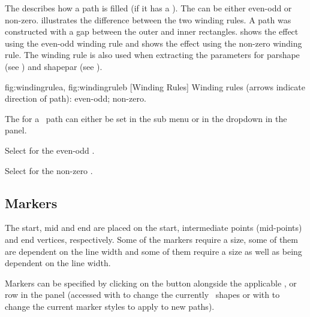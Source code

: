 The  describes how a \gls{path} is
filled (if it has a ). The
 can be either
even-odd or non-zero.  illustrates the
difference between the two winding rules. A \gls*{path} was constructed
with a \gls{gap} between the outer and inner rectangles.
 shows the effect using the even-odd
winding rule and  shows the effect
using the non-zero winding rule. The winding rule is also used when
extracting the parameters for
\gls{parshape} (see ) and
\gls{shapepar} (see ).

{
 {fig:windingrulea}{}{},
 {fig:windingruleb}{}{}
}
[Winding Rules]
{Winding rules (arrows indicate direction of path):
 even-odd;
 non-zero.}


The  for a \selected\ path can either be set
in the  sub menu or in the
 \gls{dropdown} in the
 panel.


Select  for the even-odd 
.


Select  for the non-zero 
.


\subsection{Markers}\label{sec:markers}

The start, mid and end  are placed on
the start, intermediate points (mid-points) and end vertices, respectively. Some of the
markers require a size, some of them are dependent on the line width
and some of them require a size as well as being dependent on the
line width.

Markers can be specified by clicking on the 
button alongside the applicable ,
 or 
row in the  panel (accessed with 
to change the currently \selected\ shapes or with
 to change the current marker styles to apply
to new \glspl{path}).

